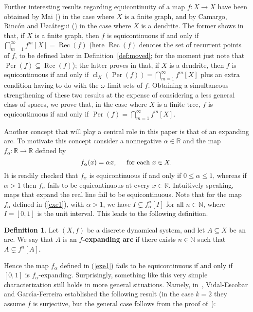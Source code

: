 \documentclass[12pt]{amsart}
\theoremstyle{definition}
\newtheorem{definition}[theorem]{Definition}
\numberwithin{equation}{section}
\DeclareMathOperator{\per}{Per}
\DeclareMathOperator{\rec}{Rec}
\DeclareMathOperator{\cl}{cl}
\begin{document}
Further interesting results regarding equicontinuity of a map $f \colon X\longrightarrow X$ have been obtained by Mai (\cite{mai}) in the case where $X$ is a finite graph, and by Camargo, Rinc\'on and 
Uzc\'ategui (\cite{camargo-rincon-uzcategui}) in the case where $X$ is a dendrite. The former shows in 
\cite[Theorem 5.2]{mai} that, if $X$ is a finite graph, then $f$ is equicontinuous if and only if 
$\bigcap_{m=1}^\infty f^m[X] = \rec(f)$ (here $\rec(f)$ denotes the set of recurrent points of $f$, to be defined later in Definition~\ref{def:moved}; for the moment just note that $\per(f)\subseteq\rec(f)$); the latter  proves in 
\cite[Theorem~4.12]{camargo-rincon-uzcategui} that, if $X$ is a dendrite, then $f$ is equicontinuous if and only if 
$\cl_X(\per(f))=\bigcap_{m=1}^\infty f^m[X]$ plus an extra condition having to do with the $\omega$-limit sets of $f$. Obtaining a simultaneous strengthening of these two results at the expense of considering a less general class of spaces, we prove that, in the case where $X$ is a finite tree, $f$ is equicontinuous if and only if $\per(f)=\bigcap_{m=1}^\infty f^m[X]$.

Another concept that will play a central role in this paper is that of an expanding arc. To motivate this concept consider a nonnegative $\alpha\in\mathbb R$ and the map
$f_\alpha \colon \mathbb R\longrightarrow\mathbb R$ defined by
\begin{equation}\label{exe1}
f_\alpha(x)=\alpha x, \hspace{.5cm} \mbox{for each } x \in X.
\end{equation}
It is readily checked that $f_\alpha$ is equicontinuous if and only if $0\leq\alpha\leq 1$, whereas if $\alpha>1$ then $f_\alpha$ fails to be equicontinuous at every $x\in\mathbb R$. Intuitively speaking, maps that expand the real line fail to be equicontinuous. Note that for the map $f_\alpha$ defined in (\ref{exe1}), with $\alpha>1$, we have 
$I\subsetneq f_\alpha^n[I]$ for all $n\in\mathbb N$, where $I=[0,1]$ is the unit interval. This leads to the following definition.

\begin{definition}
Let $(X,f)$ be a discrete dynamical system, and let $A \subseteq X$ be an arc. We say that $A$ is an 
{\bf $f$-expanding arc} if there exists $n\in\mathbb N$ such that $A \subsetneq f^n[A]$.
\end{definition}

Hence the map $f_\alpha$ defined in (\ref{exe1}) fails to be equicontinuous if and only if $[0,1]$ is 
$f_\alpha$-expanding. Surprisingly, something like this very simple characterization still holds in more general situations. Namely, in~\cite[Theorems~3.1 and 3.7]{ivon-salvador}, Vidal-Escobar and Garc\'{\i}a-Ferreira established the following result (in the case $k=2$ they assume $f$ is surjective, but the general case follows from the proof of~\cite[Theorem~1.2]{bruckner-ceder}):
\end{document}
